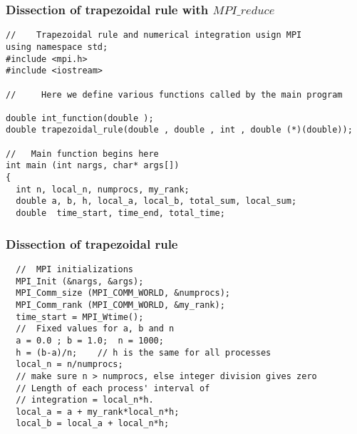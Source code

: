 \documentclass{beamer}
\begin{document}
\begin{frame}
\frametitle{Dissection of trapezoidal rule with $MPI\_reduce$}

\begin{block}{}

\begin{verbatim}
//    Trapezoidal rule and numerical integration usign MPI
using namespace std;
#include <mpi.h>
#include <iostream>

//     Here we define various functions called by the main program

double int_function(double );
double trapezoidal_rule(double , double , int , double (*)(double));

//   Main function begins here
int main (int nargs, char* args[])
{
  int n, local_n, numprocs, my_rank; 
  double a, b, h, local_a, local_b, total_sum, local_sum;   
  double  time_start, time_end, total_time;
\end{verbatim}


\end{block}
\end{frame}

\begin{frame}
\frametitle{Dissection of trapezoidal rule}

\begin{block}{}

\begin{verbatim}
  //  MPI initializations
  MPI_Init (&nargs, &args);
  MPI_Comm_size (MPI_COMM_WORLD, &numprocs);
  MPI_Comm_rank (MPI_COMM_WORLD, &my_rank);
  time_start = MPI_Wtime();
  //  Fixed values for a, b and n 
  a = 0.0 ; b = 1.0;  n = 1000;
  h = (b-a)/n;    // h is the same for all processes 
  local_n = n/numprocs;  
  // make sure n > numprocs, else integer division gives zero
  // Length of each process' interval of
  // integration = local_n*h.  
  local_a = a + my_rank*local_n*h;
  local_b = local_a + local_n*h;
\end{verbatim}


\end{block}
\end{frame}
\end{document}
